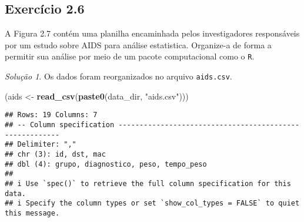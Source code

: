 \documentclass[
]{latex/krantz}
\newenvironment{Shaded}{\begin{snugshade}}{\end{snugshade}}
\newcommand{\FunctionTok}[1]{\textcolor[rgb]{0.13,0.29,0.53}{\textbf{#1}}}
\newcommand{\NormalTok}[1]{#1}
\newcommand{\OtherTok}[1]{\textcolor[rgb]{0.56,0.35,0.01}{#1}}
\newcommand{\StringTok}[1]{\textcolor[rgb]{0.31,0.60,0.02}{#1}}
\theoremstyle{definition}
\theoremstyle{definition}
\theoremstyle{definition}
\theoremstyle{definition}
\theoremstyle{remark}
\newtheorem*{solution}{Solução}
\begin{document}
\hypertarget{exr2-6}{%
\subsection*{Exercício 2.6}\label{exr2-6}}

A Figura 2.7 contém uma planilha encaminhada pelos investigadores responsáveis por um estudo sobre AIDS para análise estatistica. Organize-a de forma a permitir sua análise por meio de um pacote computacional como o \texttt{R}.

\begin{solution}
Os dados foram reorganizados no arquivo \texttt{aids.csv}.

\begin{Shaded}
\begin{Highlighting}[]
\NormalTok{(aids }\OtherTok{\textless{}{-}} \FunctionTok{read\_csv}\NormalTok{(}\FunctionTok{paste0}\NormalTok{(data\_dir, }\StringTok{"aids.csv"}\NormalTok{)))}
\end{Highlighting}
\end{Shaded}

\begin{verbatim}
## Rows: 19 Columns: 7
## -- Column specification --------------------------------------------------------
## Delimiter: ","
## chr (3): id, dst, mac
## dbl (4): grupo, diagnostico, peso, tempo_peso
## 
## i Use `spec()` to retrieve the full column specification for this data.
## i Specify the column types or set `show_col_types = FALSE` to quiet this message.
\end{verbatim}


\end{solution}
\end{document}
